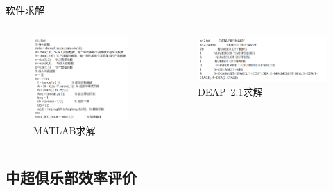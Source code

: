 \documentclass[]{beamer}
\begin{document}
\begin{frame}{软件求解}
    \begin{columns}
        \begin{column}{0.5\textwidth}
            \begin{figure}
                \includegraphics[width=1\linewidth]{MATLAB.jpg}
                \caption*{MATLAB求解}
            \end{figure}
        \end{column}
        \begin{column}{0.5\textwidth}
            \begin{figure}
                \includegraphics[width=1\linewidth]{DEAP.jpg}
                \caption*{DEAP\ 2.1求解}
            \end{figure}
        \end{column}
    \end{columns}
\end{frame}

\subsection{中超俱乐部效率评价}
\end{document}
